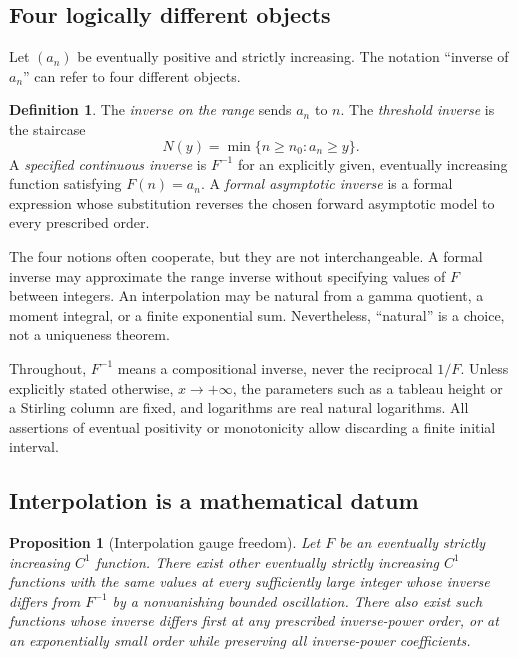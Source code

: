 \documentclass[11pt,a4paper]{article}
\numberwithin{equation}{section}
\newtheorem{proposition}[theorem]{Proposition}
\theoremstyle{definition}
\newtheorem{definition}[theorem]{Definition}
\theoremstyle{remark}
\begin{document}
\subsection{Four logically different objects}

Let $(a_n)$ be eventually positive and strictly increasing. The notation ``inverse of $a_n$'' can refer to four different objects.

\begin{definition}
The \emph{inverse on the range} sends $a_n$ to $n$. The \emph{threshold inverse} is the staircase
\begin{equation}
 N(y)=\min\{n\ge n_0:a_n\ge y\}.
 \label{eq:staircase}
\end{equation}
A \emph{specified continuous inverse} is $F^{-1}$ for an explicitly given, eventually increasing function satisfying $F(n)=a_n$. A \emph{formal asymptotic inverse} is a formal expression whose substitution reverses the chosen forward asymptotic model to every prescribed order.
\end{definition}

The four notions often cooperate, but they are not interchangeable. A formal inverse may approximate the range inverse without specifying values of $F$ between integers. An interpolation may be natural from a gamma quotient, a moment integral, or a finite exponential sum. Nevertheless, ``natural'' is a choice, not a uniqueness theorem.

Throughout, $F^{-1}$ means a compositional inverse, never the reciprocal $1/F$. Unless explicitly stated otherwise, $x\to+\infty$, the parameters such as a tableau height or a Stirling column are fixed, and logarithms are real natural logarithms. All assertions of eventual positivity or monotonicity allow discarding a finite initial interval.

\subsection{Interpolation is a mathematical datum}
\label{subsec:gauge}

\begin{proposition}[Interpolation gauge freedom]
\label{prop:gauge}
Let $F$ be an eventually strictly increasing $C^1$ function. There exist other eventually strictly increasing $C^1$ functions with the same values at every sufficiently large integer whose inverse differs from $F^{-1}$ by a nonvanishing bounded oscillation. There also exist such functions whose inverse differs first at any prescribed inverse-power order, or at an exponentially small order while preserving all inverse-power coefficients.
\end{proposition}
\end{document}
